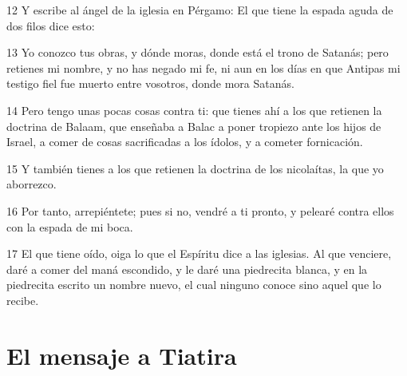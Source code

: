 \par 12 Y escribe al ángel de la iglesia en Pérgamo: El que tiene la espada aguda de dos filos dice esto:
\par 13 Yo conozco tus obras, y dónde moras, donde está el trono de Satanás; pero retienes mi nombre, y no has negado mi fe, ni aun en los días en que Antipas mi testigo fiel fue muerto entre vosotros, donde mora Satanás.
\par 14 Pero tengo unas pocas cosas contra ti: que tienes ahí a los que retienen la doctrina de Balaam, que enseñaba a Balac a poner tropiezo ante los hijos de Israel, a comer de cosas sacrificadas a los ídolos, y a cometer fornicación.
\par 15 Y también tienes a los que retienen la doctrina de los nicolaítas, la que yo aborrezco.
\par 16 Por tanto, arrepiéntete; pues si no, vendré a ti pronto, y pelearé contra ellos con la espada de mi boca.
\par 17 El que tiene oído, oiga lo que el Espíritu dice a las iglesias. Al que venciere, daré a comer del maná escondido, y le daré una piedrecita blanca, y en la piedrecita escrito un nombre nuevo, el cual ninguno conoce sino aquel que lo recibe.

\section*{El mensaje a Tiatira}

